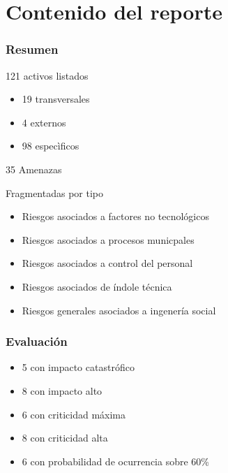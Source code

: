 \documentclass{beamer}
\begin{document}
\section{Contenido del reporte}
\begin{frame}[c,fragile]
	\frametitle{Resumen}
	\begin{itemize}
		\item{121 activos listados
			\begin{itemize}
				\item 19 transversales
				\item 4 externos
				\item 98 especìficos
			\end{itemize}
		}
		\item{35 Amenazas
			\item{ Fragmentadas por tipo 
				\begin{itemize}
					\item Riesgos asociados a factores no tecnológicos
					\item Riesgos asociados a procesos municpales
					\item Riesgos asociados a control del personal
					\item Riesgos asociados de índole técnica
					\item Riesgos generales asociados a ingenería social
				\end{itemize}
			}
		}
	\end{itemize}
\end{frame}

\begin{frame}[c,fragile]
	\frametitle{Evaluación}
		\begin{itemize}
			\item 5 con impacto catastrófico
			\item 8 con impacto alto
			\item 6 con criticidad máxima
			\item 8 con criticidad alta
			\item 6 con probabilidad de ocurrencia sobre 60\%
		\end{itemize}
\end{frame}
\end{document}
